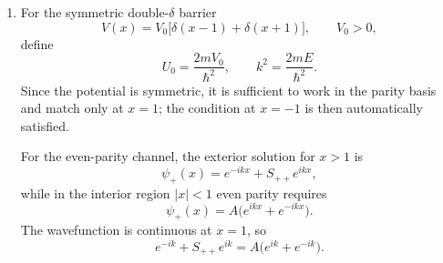 \documentclass[12pt]{article}
\begin{document}
\begin{enumerate}[label=(\alph*)]
For the even sector, poles arise when the denominator of \(S_{++}\) vanishes:
\[
q\tan\!\left(\frac{qa}{2}\right)+ik=0.
\]
Now we set \(k=i\lambda\) gives because, the complexification of the wavevector basically gives us the bound state solution since we calculated for standing waves in the interaction region, earlier solution was for the classically allowed "roadbump" potential. \footnote{Setting $k=i\lambda$ basically means that instead of \(q = \sqrt{k^2 - U}\) we have \(\lambda = \sqrt{U - k^2} = ik\).}
\[
q\tan\!\left(\frac{qa}{2}\right)-\lambda=0,
\]
hence the even bound-state condition is
\[
\boxed{
\lambda=q\tan\!\left(\frac{qa}{2}\right)
},
\qquad\boxed{
q^2+\lambda^2=U_0}.
\]
The relation \(q^2+\lambda^2=U_0\) follows from
\[
q^2=k^2+U_0=-\lambda^2+U_0.
\]

For the odd sector, poles arise when the denominator of \(S_{--}\) vanishes:
\[
q-ik\tan\!\left(\frac{qa}{2}\right)=0.
\]
Setting \(k=i\lambda\) gives
\[
q+\lambda\tan\!\left(\frac{qa}{2}\right)=0,
\]
or equivalently
\[
\boxed{
q=-\lambda\tan\!\left(\frac{qa}{2}\right)
},
\qquad
\boxed{q^2+\lambda^2=U_0}.
\]
This may also be written as
\[
\boxed{
\lambda=-q\cot\!\left(\frac{qa}{2}\right)
}.
\]

Therefore, the complex poles of \(S_{++}\) and \(S_{--}\) on the positive imaginary \(k\)-axis correspond respectively to even- and odd-parity bound states. Their zeros occur at the reflected points \(k=-i\lambda\), as required by the analytic structure of a unitary scattering matrix. The even and odd sectors differ only through their transcendental quantization conditions:
\[
\lambda=q\tan\!\left(\frac{qa}{2}\right)
\quad \text{(even)},
\qquad
\lambda=-q\cot\!\left(\frac{qa}{2}\right)
\quad \text{(odd)}.
\]
In particular, the even sector always admits the lowest bound state first, while odd bound states appear only when the well is sufficiently deep or wide.

\item For the symmetric double-\(\delta\) barrier
\[
V(x)=V_0\bigl[\delta(x-1)+\delta(x+1)\bigr],
\qquad V_0>0,
\]
define
\[
U_0=\frac{2mV_0}{\hbar^2},
\qquad
k^2=\frac{2mE}{\hbar^2}.
\]
Since the potential is symmetric, it is sufficient to work in the parity basis and match only at \(x=1\); the condition at \(x=-1\) is then automatically satisfied.

For the even-parity channel, the exterior solution for \(x>1\) is
\[
\psi_+(x)=e^{-ikx}+S_{++}e^{ikx},
\]
while in the interior region \(|x|<1\) even parity requires
\[
\psi_+(x)=A\bigl(e^{ikx}+e^{-ikx}\bigr).
\]
The wavefunction is continuous at \(x=1\), so
\[
e^{-ik}+S_{++}e^{ik}=A\bigl(e^{ik}+e^{-ik}\bigr).
\]


\end{enumerate}
\end{document}
